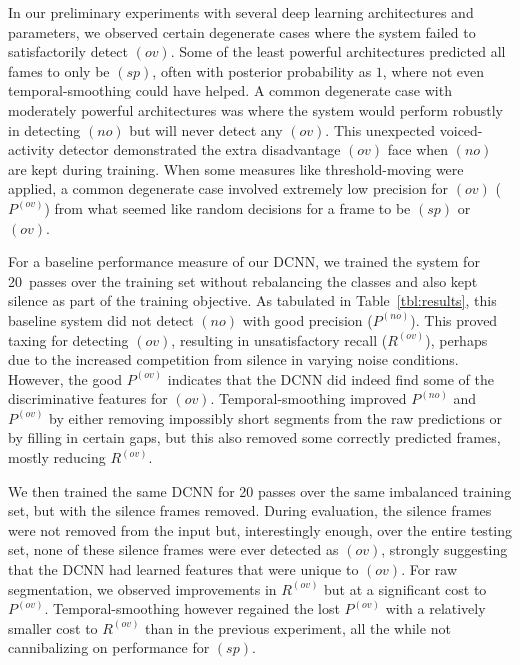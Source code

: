 \documentclass[a4paper]{article}
\begin{document}
In our preliminary experiments with several deep learning architectures and parameters,
we observed certain degenerate cases where the system failed to satisfactorily detect $(ov)$.
Some of the least powerful architectures predicted all fames to only be $(sp)$,
often with posterior probability as $1$, where not even temporal-smoothing could have helped.
A common degenerate case with moderately powerful architectures was where the system would perform robustly in detecting $(no)$ but will never detect any $(ov)$.
This unexpected voiced-activity detector demonstrated the extra disadvantage $(ov)$ face when $(no)$ are kept during training.
When some measures like threshold-moving were applied,
a common degenerate case involved extremely low precision for $(ov)$ ($P^{(ov)}$) from what seemed like random decisions for a frame to be $(sp)$ or $(ov)$.

For a baseline performance measure of our DCNN,
we trained the system for 20~passes over the training set without rebalancing the classes and also kept silence as part of the training objective.
As tabulated in Table~\ref{tbl:results},
this baseline system did not detect $(no)$ with good precision ($P^{(no)}$).
This proved taxing for detecting $(ov)$, resulting in unsatisfactory recall ($R^{(ov)}$),
perhaps due to the increased competition from silence in varying noise conditions.
However, the good $P^{(ov)}$ indicates that the DCNN did indeed find some of the discriminative features for $(ov)$.
Temporal-smoothing improved $P^{(no)}$ and $P^{(ov)}$ by either removing impossibly short segments from the raw predictions or by filling in certain gaps,
but this also removed some correctly predicted frames, mostly reducing $R^{(ov)}$.

We then trained the same DCNN for 20 passes over the same imbalanced training set,
but with the silence frames removed.
During evaluation, the silence frames were not removed from the input but,
interestingly enough, over the entire testing set,
none of these silence frames were ever detected as $(ov)$,
strongly suggesting that the DCNN had learned features that were unique to $(ov)$.
For raw segmentation, we observed improvements in $R^{(ov)}$ but at a significant cost to $P^{(ov)}$.
Temporal-smoothing however regained the lost $P^{(ov)}$ with a relatively smaller cost to $R^{(ov)}$ than in the previous experiment,
all the while not cannibalizing on performance for $(sp)$.
\end{document}
